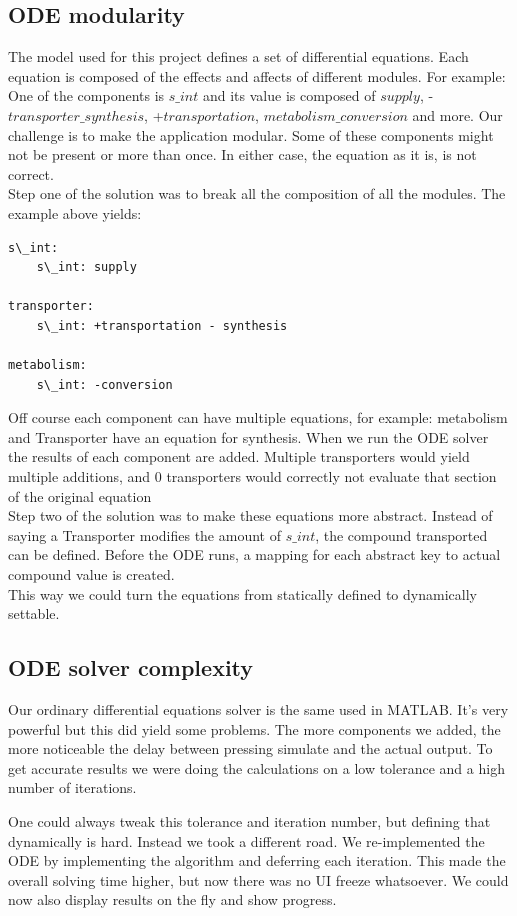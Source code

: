 \documentclass[10pt,a4paper]{report}
\begin{document}
		\subsection{ODE modularity}
			The model used for this project defines a set of differential equations. Each equation is composed of the effects and affects of different modules. For example: One of the components is $s\_int$ and its value is composed of $supply$, -$transporter\_synthesis$, +$transportation$, $metabolism\_conversion$ and more. Our challenge is to make the application modular. Some of these components might not be present or more than once. In either case, the equation as it is, is not correct.\\
			Step one of the solution was to break all the composition of all the modules. The example above yields:
			\begin{lstlisting}
s\_int: 
	s\_int: supply

transporter:
	s\_int: +transportation - synthesis
	
metabolism:
	s\_int: -conversion
			\end{lstlisting}
			Off course each component can have multiple equations, for example: metabolism and Transporter have an equation for synthesis. When we run the ODE solver the results of each component are added. Multiple transporters would yield multiple additions, and 0 transporters would correctly not evaluate that section of the original equation\\
			Step two of the solution was to make these equations more abstract. Instead of saying a Transporter modifies the amount of $s\_int$, the compound transported can be defined. Before the ODE runs, a mapping for each abstract key to actual compound value is created. \\
			This way we could turn the equations from statically defined to dynamically settable.
			
		\subsection{ODE solver complexity}
			Our ordinary differential equations solver is the same used in MATLAB. It's very powerful but this did yield some problems. The more components we added, the more noticeable the delay between pressing simulate and the actual output. To get accurate results we were doing the calculations on a low tolerance and a high number of iterations.
			
			One could always tweak this tolerance and iteration number, but defining that dynamically is hard. Instead we took a different road. We re-implemented the ODE by implementing the algorithm and deferring each iteration. This made the overall solving time higher, but now there was no UI freeze whatsoever. We could now also display results on the fly and show progress.
			
\end{document}
